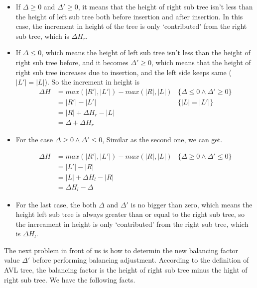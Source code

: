 \documentclass{article}
\begin{document}
\begin{itemize}
\item If $\Delta \geq 0$ and $\Delta' \geq 0$, it means that the height
of right sub tree isn't less than the height of left sub tree both
before insertion and after insertion. In this case, the increment in
height of the tree is only `contributed' from the right sub tree, which
is $\Delta H_r$.

\item If $\Delta \leq 0$, which means the height of left sub tree isn't
less than the height of right sub tree before, and it becomes 
$\Delta' \geq 0$,
which means that the height of right sub tree increases due to insertion, 
and the left side keeps same ($|L'|=|L|$). So the increment in height is
\[
\begin{array}{rll}
\Delta H & = max(|R'|, |L'|) - max (|R|, |L|) & \{\Delta \leq 0 \land \Delta' \geq 0 \}\\
         & = |R'|-|L'| & \{|L|=|L'| \}\\
         & = |R|+\Delta H_r - |L| & \\
         & = \Delta + \Delta H_r &
\end{array}
\]

\item For the case $\Delta \geq 0 \land \Delta' \leq 0$, Similar as the
second one, we can get.

\[
\begin{array}{rll}
\Delta H & = max(|R'|, |L'|) - max (|R|, |L|) & \{\Delta \geq 0 \land \Delta' \leq 0 \}\\
         & = |L'|-|R| & \\
         & = |L|+\Delta H_l - |R| & \\
         & = \Delta H_l - \Delta&
\end{array}
\]

\item For the last case, the both $\Delta$ and $\Delta'$ is no bigger than
zero, which means the height left sub tree is always greater than or equal
 to the right sub tree, so the increament in height is only `contributed'
from the right sub tree, which is $\Delta H_l$.
\end{itemize}

The next problem in front of us is how to determin the new balancing
factor value $\Delta'$ before performing balancing adjustment.
According to the definition of AVL tree, the balancing factor is the
height of right sub tree minus the hight of right sub tree. We have
the following facts.
\end{document}

